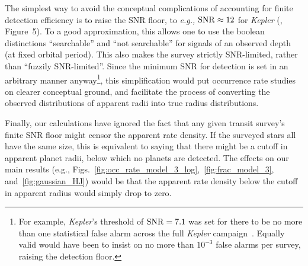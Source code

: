 \documentclass[12pt,modern]{aastex61}
\begin{document}
The simplest way to avoid the conceptual complications of accounting for 
finite detection efficiency is to raise the SNR floor, to {\it e.g.,} 
${\rm SNR} \approx 12$ for {\it Kepler} 
(\citealt{fulton_california-_2017}, Figure~5).
To a good approximation, this allows one to use the boolean distinctions 
``searchable'' and ``not searchable'' for signals of an observed depth (at 
fixed orbital period).
This also makes the survey strictly SNR-limited, rather than ``fuzzily 
SNR-limited''.
Since the minimum SNR for detection is set in an arbitrary manner 
anyway\footnote{For example, {\it Kepler}'s threshold of ${\rm SNR}=7.1$ was 
set for there to be no more than one statistical false alarm across the full 
{\it Kepler} campaign~\citep{jenkins_tests_2002}. Equally valid would have 
been to insist on no more than $10^{-3}$ false alarms per survey, raising the 
detection floor.
}, this simplification would put occurrence rate studies on 
clearer conceptual 
ground, and facilitate the process of converting the observed distributions
of apparent radii into true radius distributions.

Finally, our calculations have ignored the fact that any given transit 
survey's finite SNR floor might censor the apparent rate density.
If the surveyed stars all have the same size, this is equivalent to 
saying that there might be a cutoff in apparent planet radii, below which no 
planets are detected.
The effects on our main results (e.g., 
Figs.~\ref{fig:occ_rate_model_3_log},~\ref{fig:frac_model_3}, 
and~\ref{fig:gaussian_HJ}) would be that the apparent rate density 
below the cutoff in apparent radius would simply drop to zero.

\end{document}
